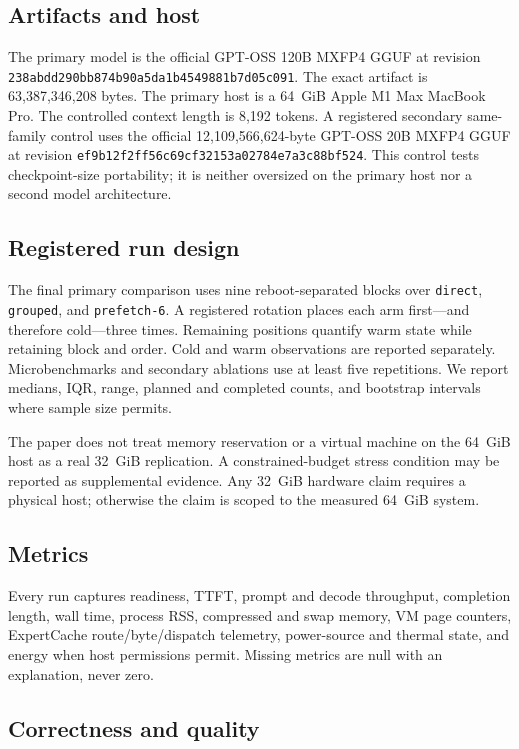 \documentclass[10pt,twocolumn]{article}
\begin{document}
\subsection{Artifacts and host}

The primary model is the official GPT-OSS 120B MXFP4 GGUF at revision
\texttt{238abdd290bb874b90a5da1b4549881b7d05c091}.  The exact artifact is
63,387,346,208 bytes.  The primary host is a 64~GiB Apple M1 Max MacBook Pro.
The controlled context length is 8,192 tokens.  A registered secondary
same-family control uses the official 12,109,566,624-byte GPT-OSS 20B MXFP4
GGUF at revision
\texttt{ef9b12f2ff56c69cf32153a02784e7a3c88bf524}.  This control tests
checkpoint-size portability; it is neither oversized on the primary host nor
a second model architecture.

\subsection{Registered run design}

The final primary comparison uses nine reboot-separated blocks over
\texttt{direct}, \texttt{grouped}, and \texttt{prefetch-6}.  A registered
rotation places each arm first---and therefore cold---three times.  Remaining
positions quantify warm state while retaining block and order.  Cold and warm
observations are reported separately.  Microbenchmarks and secondary ablations
use at least five repetitions.  We report medians, IQR, range, planned and
completed counts, and bootstrap intervals where sample size permits.

The paper does not treat memory reservation or a virtual machine on the 64~GiB
host as a real 32~GiB replication.  A constrained-budget stress condition may
be reported as supplemental evidence.  Any 32~GiB hardware claim requires a
physical host; otherwise the claim is scoped to the measured 64~GiB system.

\subsection{Metrics}

Every run captures readiness, TTFT, prompt and decode throughput, completion
length, wall time, process RSS, compressed and swap memory, VM page counters,
ExpertCache route/byte/dispatch telemetry, power-source and thermal state, and
energy when host permissions permit.  Missing metrics are null with an
explanation, never zero.

\subsection{Correctness and quality}
\end{document}
